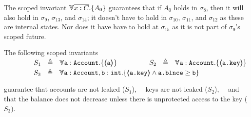 The scoped invariant   ${\TwoStatesN {\overline {x:C}} {A_0}}$   guarantees that  if $A_0$ holds in $\sigma_8$, then it will also hold in $\sigma_9$,    $\sigma_{13}$, and $\sigma_{14}$;
 it   doesn't have to hold in $\sigma_{10}$, $\sigma_{11}$,  and $\sigma_{12}$ as these are internal states.
 Nor does it have have to hold at $\sigma_{15}$ as it is not part of $\sigma_9$'s scoped future.


 

    
\label{s:bank}

\begin{example}
\label{s:bankSpecEx}
The following scoped invariants\\
$\strut \SPSP\ \ \   S_1\ \  \triangleq \ \ \TwoStatesN {\prg{a}:\prg{Account}}  {\inside{\prg{a}}} $ 
\hspace{1.1cm}
$\strut  \SPSP\ \ \   S_2\ \  \triangleq \ \ \TwoStatesN  {\prg{a}:\prg{Account}}  {\inside{\prg{a.key}}} $ 
\\
$\strut  \SPSP\ \ \   S_3\ \  \triangleq \ \ \TwoStatesN{ \prg{a}:\prg{Account},\prg{b}:\prg{int} } {\inside{\prg{a.key}} \wedge \prg{a.\balance} \geq \prg{b} } $ 

\noindent
 guarantee that   accounts are not leaked  ($S_1$), \ \ keys are not leaked  ($S_2$), \ \  and that the balance does not decrease unless there is unprotected access to the key  ($S_3$).
%
\end{example} 

